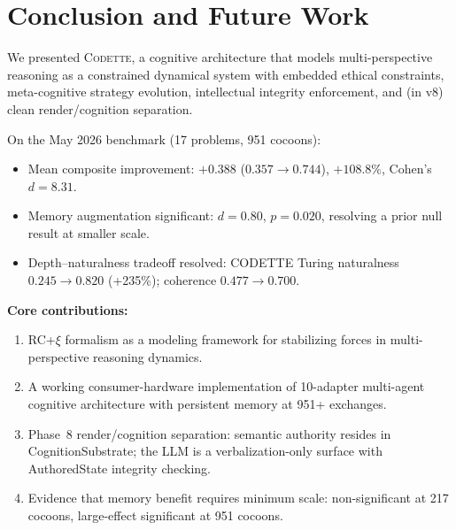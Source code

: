 \documentclass[11pt,a4paper]{article}
\newcommand{\codette}{\textsc{Codette}}
\begin{document}
\section{Conclusion and Future Work}
\label{sec:conclusion}

We presented \codette{}, a cognitive architecture that models multi-perspective
reasoning as a constrained dynamical system with embedded ethical constraints,
meta-cognitive strategy evolution, intellectual integrity enforcement, and
(in v8) clean render/cognition separation.

On the May 2026 benchmark (17 problems, 951 cocoons):

\begin{itemize}[nosep]
  \item Mean composite improvement: $+0.388$ ($0.357 \to 0.744$), $+108.8\%$,
    Cohen's $d=8.31$.
  \item Memory augmentation significant: $d=0.80$, $p=0.020$, resolving a
    prior null result at smaller scale.
  \item Depth--naturalness tradeoff resolved: CODETTE Turing naturalness
    $0.245 \to 0.820$ (+235\%); coherence $0.477 \to 0.700$.
\end{itemize}

\textbf{Core contributions:}

\begin{enumerate}[nosep]
  \item RC+$\xi$ formalism as a modeling framework for stabilizing forces in
    multi-perspective reasoning dynamics.
  \item A working consumer-hardware implementation of 10-adapter multi-agent
    cognitive architecture with persistent memory at 951+ exchanges.
  \item Phase~8 render/cognition separation: semantic authority resides in
    CognitionSubstrate; the LLM is a verbalization-only surface with
    AuthoredState integrity checking.
  \item Evidence that memory benefit requires minimum scale: non-significant
    at 217 cocoons, large-effect significant at 951 cocoons.
\end{enumerate}
\end{document}
